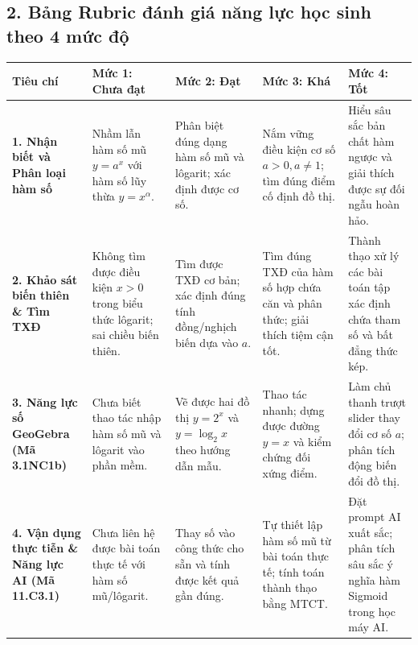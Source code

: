 \documentclass[12pt, a4paper]{article}
\begin{document}
\subsection*{2. Bảng Rubric đánh giá năng lực học sinh theo 4 mức độ}

\begin{center}
\begin{tabularx}{\textwidth}{|p{2.8cm}|X|X|X|X|}
    \hline
    \textbf{Tiêu chí} & \textbf{Mức 1: Chưa đạt} & \textbf{Mức 2: Đạt} & \textbf{Mức 3: Khá} & \textbf{Mức 4: Tốt} \\ \hline
    \textbf{1. Nhận biết và Phân loại hàm số} & Nhầm lẫn hàm số mũ $y = a^x$ với hàm số lũy thừa $y = x^\alpha$. & Phân biệt đúng dạng hàm số mũ và lôgarit; xác định được cơ số. & Nắm vững điều kiện cơ số $a > 0, a \neq 1$; tìm đúng điểm cố định đồ thị. & Hiểu sâu sắc bản chất hàm ngược và giải thích được sự đối ngẫu hoàn hảo. \\ \hline
    \textbf{2. Khảo sát biến thiên \& Tìm TXĐ} & Không tìm được điều kiện $x > 0$ trong biểu thức lôgarit; sai chiều biến thiên. & Tìm được TXĐ cơ bản; xác định đúng tính đồng/nghịch biến dựa vào $a$. & Tìm đúng TXĐ của hàm số hợp chứa căn và phân thức; giải thích tiệm cận tốt. & Thành thạo xử lý các bài toán tập xác định chứa tham số và bất đẳng thức kép. \\ \hline
    \textbf{3. Năng lực số GeoGebra (Mã 3.1NC1b)} & Chưa biết thao tác nhập hàm số mũ và lôgarit vào phần mềm. & Vẽ được hai đồ thị $y = 2^x$ và $y = \log_2 x$ theo hướng dẫn mẫu. & Thao tác nhanh; dựng được đường $y = x$ và kiểm chứng đối xứng điểm. & Làm chủ thanh trượt slider thay đổi cơ số $a$; phân tích động biến đổi đồ thị. \\ \hline
    \textbf{4. Vận dụng thực tiễn \& Năng lực AI (Mã 11.C3.1)} & Chưa liên hệ được bài toán thực tế với hàm số mũ/lôgarit. & Thay số vào công thức cho sẵn và tính được kết quả gần đúng. & Tự thiết lập hàm số mũ từ bài toán thực tế; tính toán thành thạo bằng MTCT. & Đặt prompt AI xuất sắc; phân tích sâu sắc ý nghĩa hàm Sigmoid trong học máy AI. \\ \hline
\end{tabularx}
\end{center}
\end{document}
